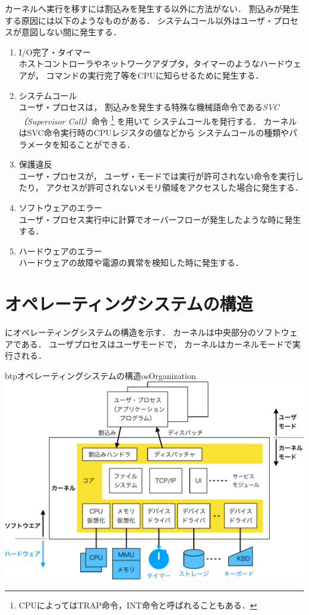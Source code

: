 カーネルへ実行を移すには割込みを発生する以外に方法がない．
割込みが発生する原因には以下のようなものがある．
システムコール以外はユーザ・プロセスが意図しない間に発生する．

\begin{enumerate}
\item I/O完了・タイマー \\
  ホストコントローラやネットワークアダプタ，タイマーのようなハードウェアが，
  コマンドの実行完了等をCPUに知らせるために発生する．
\item システムコール \\
  ユーザ・プロセスは，
  割込みを発生する特殊な機械語命令である\emph{SVC（Supervisor Call）}命令
  \footnote{
    CPUによってはTRAP命令，INT命令と呼ばれることもある．
  }
  を用いて
  システムコールを発行する．
  カーネルはSVC命令実行時のCPUレジスタの値などから
  システムコールの種類やパラメータを知ることができる．
\item 保護違反 \\
  ユーザ・プロセスが，
  ユーザ・モードでは実行が許可されない命令を実行したり，
  アクセスが許可されないメモリ領域をアクセスした場合に発生する．
\item ソフトウェアのエラー \\
  ユーザ・プロセス実行中に計算でオーバーフローが発生したような時に発生する．
\item ハードウェアのエラー \\
  ハードウェアの故障や電源の異常を検知した時に発生する．
\end{enumerate}

\section{オペレーティングシステムの構造}
にオペレーティングシステムの構造を示す．
カーネルは中央部分のソフトウェアである．
ユーザプロセスはユーザモードで，
カーネルはカーネルモードで実行される．

\begin{myfig}{btp}{オペレーティングシステムの構造}{osOrganization}
  \includegraphics[scale=0.66]{Fig/osOrganization-crop.pdf}
\end{myfig}

